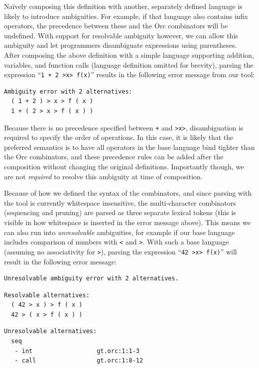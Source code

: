 \documentclass[acmsmall,review,anonymous]{acmart}\settopmatter{printfolios=true,printccs=false,printacmref=false}
\newcommand{\ocaml}{\lstinline[language={[objective]caml}]}
\begin{document}
\noindent
Na\"{i}vely composing this definition with another, separately
defined language is likely to introduce ambiguities. For example,
if that language also contains infix operators, the precedence
between these and the Orc combinators will be undefined. With
support for resolvable ambiguity however, we can allow this
ambiguity and let programmers disambiguate expressions using
parentheses. After composing the above definition with a simple
language supporting addition, variables, and function calls
(language definition omitted for brevity), parsing the expression
%
``\ocaml{1 + 2 >x> f(x)}''
%
results in the following error message from our tool:

{\small
\begin{lstlisting}[language={[objective]caml}]
Ambiguity error with 2 alternatives:
  ( 1 + 2 ) > x > f ( x )
  1 + ( 2 > x > f ( x ) )
\end{lstlisting}
}

\noindent
Because there is no precedence specified between \ocaml{+} and
\ocaml{>x>}, disambiguation is required to specify the order of
operations.
%
In this case, it is likely that the preferred semantics is to have
all operators in the base language bind tighter than the Orc
combinators, and these precedence rules can be added after the
composition without changing the original definitions. Importantly
though, we are not \emph{required} to resolve this ambiguity at
time of composition.

Because of how we defined the syntax of the combinators, and since
parsing with the tool is currently whitespace insensitive, the
multi-character combinators (sequencing and pruning) are parsed as
three separate lexical tokens (this is visible in how whitespace
is inserted in the error message above). This means we can also
run into \emph{unresolvable} ambiguities, for example if our base
language includes comparison of numbers with \ocaml{<} and
\ocaml{>}. With such a base language (assuming no associativity
for \ocaml{>}), parsing the expression
%
``\ocaml{42 >x> f(x)}''
%
will result in the following error message:

{\small
\begin{lstlisting}[language={[objective]caml}]
Unresolvable ambiguity error with 2 alternatives.
\end{lstlisting}

\begin{minipage}{.3\textwidth}
\begin{lstlisting}[language={[objective]caml}]
Resolvable alternatives:
  ( 42 > x ) > f ( x )
  42 > ( x > f ( x ) )
\end{lstlisting}
\end{minipage}
\hfill
\begin{minipage}{.5\textwidth}
\begin{lstlisting}[language={[objective]caml}]
Unresolvable alternatives:
  seq
   - int                  gt.orc:1:1-3
   - call                 gt.orc:1:8-12
\end{lstlisting}
\end{minipage}
}
\end{document}
